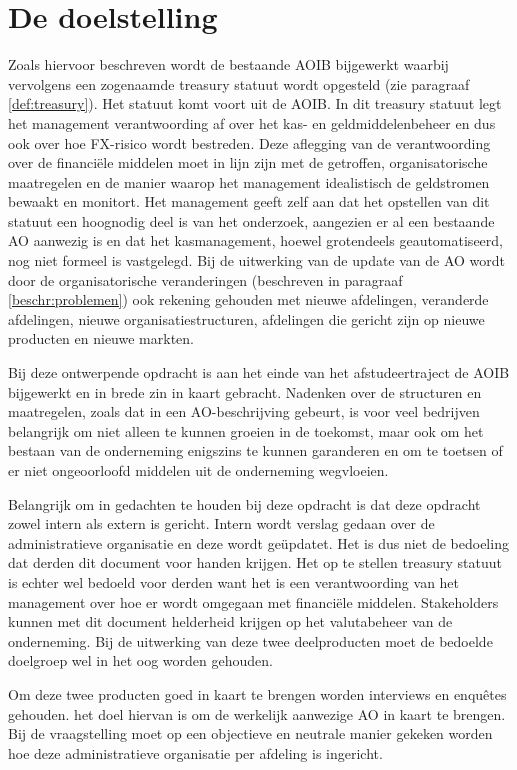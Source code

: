 \documentclass[10pt,a4paper,oneside]{report}
\begin{document}
    \section{De doelstelling}
Zoals hiervoor beschreven wordt de bestaande AOIB bijgewerkt waarbij vervolgens een zogenaamde treasury statuut wordt opgesteld (zie paragraaf \ref{def:treasury}). Het statuut komt voort uit de AOIB. In dit treasury statuut legt het management verantwoording af over het kas- en geldmiddelenbeheer en dus ook over hoe FX-risico wordt bestreden. Deze aflegging van de verantwoording over de financiële middelen moet in lijn zijn met de getroffen, organisatorische maatregelen en de manier waarop het management idealistisch de geldstromen bewaakt en monitort. Het management geeft zelf aan dat het opstellen van dit statuut een hoognodig deel is van het onderzoek, aangezien er al een bestaande AO aanwezig is en dat het kasmanagement, hoewel grotendeels geautomatiseerd, nog niet formeel is vastgelegd. Bij de uitwerking van de update van de AO wordt door de organisatorische veranderingen (beschreven in paragraaf \ref{beschr:problemen}) ook rekening gehouden met nieuwe afdelingen, veranderde afdelingen, nieuwe organisatiestructuren, afdelingen die gericht zijn op nieuwe producten en nieuwe markten.

Bij deze ontwerpende opdracht is aan het einde van het afstudeertraject de AOIB bijgewerkt en in brede zin in kaart gebracht. Nadenken over de structuren en maatregelen, zoals dat in een AO-beschrijving gebeurt, is voor veel bedrijven belangrijk om niet alleen te kunnen groeien in de toekomst, maar ook om het bestaan van de onderneming enigszins te kunnen garanderen en om te toetsen of er niet ongeoorloofd middelen uit de onderneming wegvloeien.

Belangrijk om in gedachten te houden bij deze opdracht is dat deze opdracht zowel intern als extern is gericht. Intern wordt verslag gedaan over de administratieve organisatie en deze wordt geüpdatet. Het is dus niet de bedoeling dat derden dit document voor handen krijgen. Het op te stellen treasury statuut is echter wel bedoeld voor derden want het is een verantwoording van het management over hoe er wordt omgegaan met financiële middelen. Stakeholders kunnen met dit document helderheid krijgen op het valutabeheer van de onderneming. Bij de uitwerking van deze twee deelproducten moet de bedoelde doelgroep wel in het oog worden gehouden.

Om deze twee producten goed in kaart te brengen worden interviews en enquêtes gehouden. het doel hiervan is om de werkelijk aanwezige AO in kaart te brengen. Bij de vraagstelling moet op een objectieve en neutrale manier gekeken worden hoe deze administratieve organisatie per afdeling is ingericht.
\end{document}
